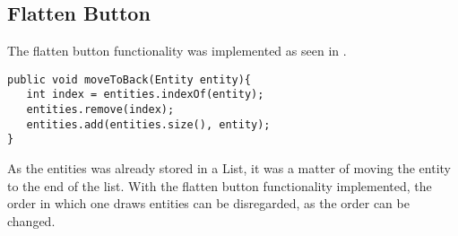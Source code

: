 \subsection{Flatten Button}
The flatten button functionality was implemented as seen in .

\begin{lstlisting}[label={lst:flatten}, caption={Flatten Button functionality}]
public void moveToBack(Entity entity){
   int index = entities.indexOf(entity);
   entities.remove(index);
   entities.add(entities.size(), entity);
}
\end{lstlisting}

As the entities was already stored in a List, it was a matter of moving the entity to the end of the list.
With the flatten button functionality implemented, the order in which one draws entities can be disregarded, as the order can be changed.